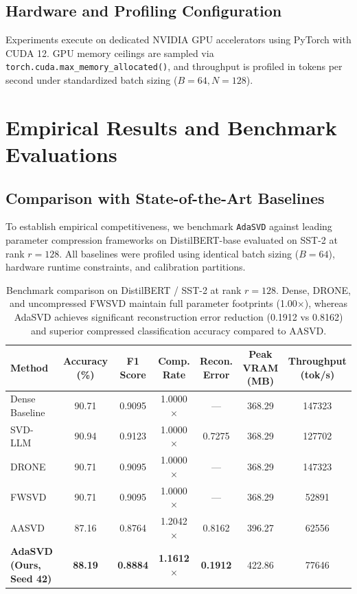 \documentclass{article}
\begin{document}
\subsection{Hardware and Profiling Configuration}
Experiments execute on dedicated NVIDIA GPU accelerators using PyTorch with CUDA 12. GPU memory ceilings are sampled via \texttt{torch.cuda.max\_memory\_allocated()}, and throughput is profiled in tokens per second under standardized batch sizing ($B=64, N=128$).


\section{Empirical Results and Benchmark Evaluations}
\label{sec:results}

\subsection{Comparison with State-of-the-Art Baselines}
To establish empirical competitiveness, we benchmark \texttt{AdaSVD} against leading parameter compression frameworks on DistilBERT-base evaluated on SST-2 at rank $r=128$. All baselines were profiled using identical batch sizing ($B=64$), hardware runtime constraints, and calibration partitions.

\begin{table}[t]
\centering
\small
\begin{tabular}{lcccccc}
\toprule
\textbf{Method} & \textbf{Accuracy (\%)} & \textbf{F1 Score} & \textbf{Comp. Rate} & \textbf{Recon. Error} & \textbf{Peak VRAM (MB)} & \textbf{Throughput (tok/s)} \\
\midrule
Dense Baseline & 90.71 & 0.9095 & 1.0000$\times$ & --- & 368.29 & 147323 \\
SVD-LLM~\cite{wang2025svdllm} & 90.94 & 0.9123 & 1.0000$\times$ & 0.7275 & 368.29 & 127702 \\
DRONE~\cite{chen2021drone} & 90.71 & 0.9095 & 1.0000$\times$ & --- & 368.29 & 147323 \\
FWSVD~\cite{hsu2022fwsvd} & 90.71 & 0.9095 & 1.0000$\times$ & --- & 368.29 & 52891 \\
AASVD & 87.16 & 0.8764 & 1.2042$\times$ & 0.8162 & 396.27 & 62556 \\
\textbf{AdaSVD (Ours, Seed 42)} & \textbf{88.19} & \textbf{0.8884} & \textbf{1.1612$\times$} & \textbf{0.1912} & 422.86 & 77646 \\
\bottomrule
\end{tabular}
\caption{Benchmark comparison on DistilBERT / SST-2 at rank $r=128$. Dense, DRONE, and uncompressed FWSVD maintain full parameter footprints (1.00$\times$), whereas AdaSVD achieves significant reconstruction error reduction (0.1912 vs 0.8162) and superior compressed classification accuracy compared to AASVD.}
\label{tab:sota_comparison}
\end{table}
\end{document}
